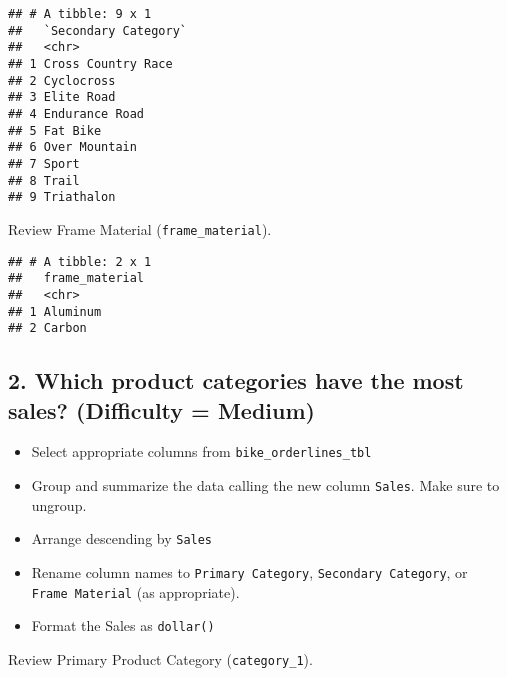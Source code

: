 \documentclass[]{article}
\newenvironment{Shaded}{\begin{snugshade}}{\end{snugshade}}
\newcommand{\KeywordTok}[1]{\textcolor[rgb]{0.13,0.29,0.53}{\textbf{#1}}}
\newcommand{\NormalTok}[1]{#1}
\newcommand{\OperatorTok}[1]{\textcolor[rgb]{0.81,0.36,0.00}{\textbf{#1}}}
\newcommand{\StringTok}[1]{\textcolor[rgb]{0.31,0.60,0.02}{#1}}
\providecommand{\tightlist}{%
  \setlength{\itemsep}{0pt}\setlength{\parskip}{0pt}}
\begin{document}
\begin{verbatim}
## # A tibble: 9 x 1
##   `Secondary Category`
##   <chr>               
## 1 Cross Country Race  
## 2 Cyclocross          
## 3 Elite Road          
## 4 Endurance Road      
## 5 Fat Bike            
## 6 Over Mountain       
## 7 Sport               
## 8 Trail               
## 9 Triathalon
\end{verbatim}

Review Frame Material (\texttt{frame\_material}).

\begin{Shaded}
\end{Shaded}

\begin{verbatim}
## # A tibble: 2 x 1
##   frame_material
##   <chr>         
## 1 Aluminum      
## 2 Carbon
\end{verbatim}

\hypertarget{which-product-categories-have-the-most-sales-difficulty-medium}{%
\subsection{2. Which product categories have the most sales? (Difficulty
=
Medium)}\label{which-product-categories-have-the-most-sales-difficulty-medium}}

\begin{itemize}
\tightlist
\item
  Select appropriate columns from \texttt{bike\_orderlines\_tbl}
\item
  Group and summarize the data calling the new column \texttt{Sales}.
  Make sure to ungroup.
\item
  Arrange descending by \texttt{Sales}
\item
  Rename column names to \texttt{Primary\ Category},
  \texttt{Secondary\ Category}, or \texttt{Frame\ Material} (as
  appropriate).
\item
  Format the Sales as \texttt{dollar()}
\end{itemize}

Review Primary Product Category (\texttt{category\_1}).
\end{document}
